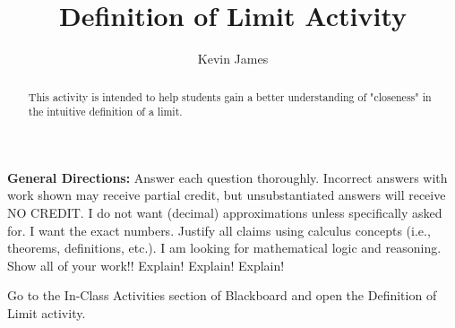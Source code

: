 \documentclass[handout,nooutcomes,noauthor,12pt]{Ximera}
\author{Kevin James}
\title{Definition of Limit Activity}
\begin{document}
	\begin{abstract}
		This activity is intended to help students gain a better understanding of "closeness" in the intuitive definition of a limit.
	\end{abstract}
	\maketitle
	\textbf{General Directions:}  Answer each question thoroughly.  Incorrect answers with work shown may receive partial credit, but unsubstantiated answers will receive NO CREDIT.  I do not want (decimal) approximations unless specifically asked for.  I want the exact numbers.  Justify all claims using calculus concepts (i.e., theorems, definitions, etc.).  I am looking for mathematical logic and reasoning.  Show all of your work!! Explain!  Explain!  Explain!
	
	Go to the In-Class Activities section of Blackboard and open the Definition of Limit activity.  
	
\end{document}
